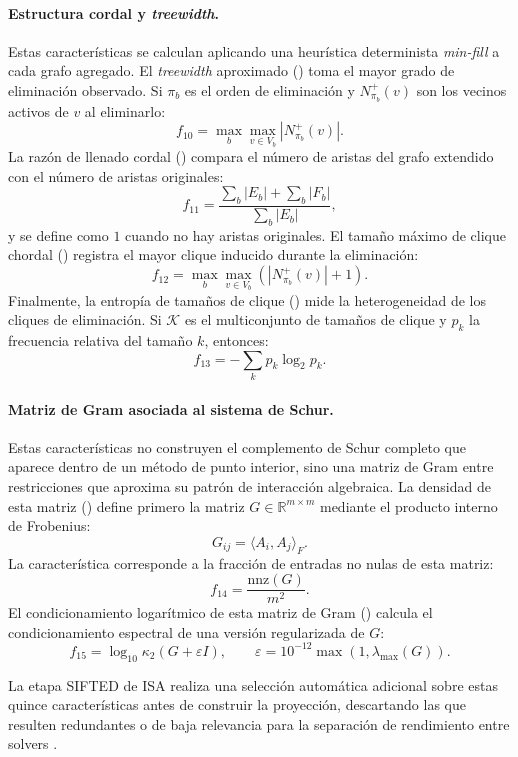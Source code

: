 \paragraph{Estructura cordal y \textit{treewidth}.}
Estas características se calculan aplicando una heurística determinista
\textit{min-fill} a cada grafo agregado.
El \textit{treewidth} aproximado () toma el mayor grado de
eliminación observado.
Si $\pi_b$ es el orden de eliminación y $N_{\pi_b}^{+}(v)$ son los vecinos activos de
$v$ al eliminarlo:
\[
    f_{10} = \max_b \max_{v\in V_b}|N_{\pi_b}^{+}(v)|.
\]
La razón de llenado cordal () compara el número de aristas
del grafo extendido con el número de aristas originales:
\[
    f_{11} =
    \frac{\sum_b |E_b|+\sum_b |F_b|}
         {\sum_b |E_b|},
\]
y se define como $1$ cuando no hay aristas originales.
El tamaño máximo de clique chordal () registra el mayor
clique inducido durante la eliminación:
\[
    f_{12} =
    \max_b \max_{v\in V_b}\left(|N_{\pi_b}^{+}(v)|+1\right).
\]
Finalmente, la entropía de tamaños de clique () mide la
heterogeneidad de los cliques de eliminación.
Si $\mathcal{K}$ es el multiconjunto de tamaños de clique y $p_k$ la frecuencia
relativa del tamaño $k$, entonces:
\[
    f_{13} = -\sum_k p_k\log_2 p_k.
\]

\paragraph{Matriz de Gram asociada al sistema de Schur.}
Estas características no construyen el complemento de Schur completo que aparece dentro
de un método de punto interior, sino una matriz de Gram entre restricciones que aproxima
su patrón de interacción algebraica.
La densidad de esta matriz () define primero
la matriz $G\in\mathbb{R}^{m\times m}$ mediante el producto interno de Frobenius:
\[
    G_{ij}=\langle A_i,A_j\rangle_F.
\]
La característica corresponde a la fracción de entradas no nulas de esta matriz:
\[
    f_{14} = \frac{\mathrm{nnz}(G)}{m^2}.
\]
El condicionamiento logarítmico de esta matriz de Gram
() calcula el condicionamiento espectral de una versión
regularizada de $G$:
\[
    f_{15} = \log_{10}\kappa_2(G+\varepsilon I),
    \qquad
    \varepsilon=10^{-12}\max(1,\lambda_{\max}(G)).
\]

La etapa SIFTED de ISA realiza una selección automática adicional sobre estas quince características antes de construir la proyección, descartando
las que resulten redundantes o de baja relevancia para la separación de rendimiento entre solvers \cite{smith-milesInstanceSpaceAnalysis2023}.

